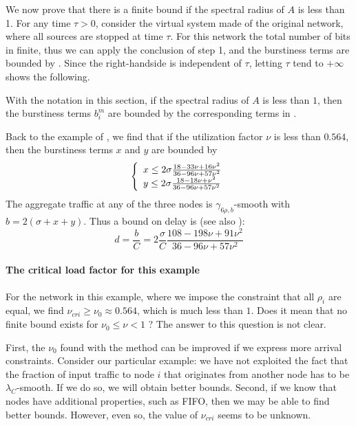 We now prove that there is a finite bound if the spectral radius
of $A$ is less than 1. For any time $\tau>0$, consider the virtual
system made of the original network, where all sources are stopped
at time $\tau$. For this network the total number of bits in
finite, thus we can apply the conclusion of step 1, and the
burstiness terms are bounded by . Since the
right-handside  is independent of $\tau$, letting
$\tau$ tend to $+\infty $ shows the following.
\begin{proposition}
With the notation in this section, if the spectral radius of $A$
is less than $1$, then the burstiness terms $b^m_i$ are bounded by
the corresponding terms in .
\end{proposition}
Back to the example of , we find that if the
utilization factor $\nu$ is less than $0.564$, then the burstiness
terms $x$ and $y$ are bounded by
$$
\left\{\begin{array}{l} 
 x \leq 2 \sigma \frac{18 -33 \nu + 16 \nu^2}
 {36 -96 \nu + 57 \nu^2 }\\
 y \leq  2 \sigma \frac{18 - 18  \nu + \nu^2}
 {36 -96 \nu + 57 \nu^2}
  \end{array} \right.
$$
The aggregate traffic at any of the three nodes is $\gamma_{6\rho,
b}$-smooth with $b=2(\sigma + x + y)$. Thus a bound on delay is
(see also ):
$$
 d=\frac{b}{C}= 2 \frac{\sigma}{C}
 \frac{108 - 198 \nu + 91 \nu^2}{36 - 96 \nu + 57 \nu^2}
$$

\begin{figure}[!htbp]
\end{figure}

\paragraph{The critical load factor for this example}
For the network in this example, where we impose the constraint
that all $\rho_i$ are equal, we find $\nu_{cri} \geq \nu_0 \approx
0.564$, which is much less than $1$. Does it mean that no finite
bound exists for  $\nu_0 \leq \nu <1$ ? The answer to this
question is not clear.

First, the $\nu_0$ found with the method can be improved if we
express more arrival constraints. Consider our particular example:
we have not exploited the fact that the fraction of input traffic
to node $i$ that originates from another node has to be
$\lambda_C$-smooth. If we do so, we will obtain better bounds.
Second, if we know that nodes have additional properties, such as
FIFO, then we may be able to find better bounds. However, even so,
the value of $\nu_{cri}$ seems to be unknown.


